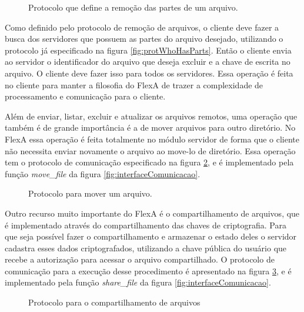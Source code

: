         \begin{figure}[!ht]
        \caption{Protocolo que define a remoção das partes de um arquivo.}
        \label{fig:protRemoveFile}
        \end{figure}
        
        
        Como definido pelo protocolo de remoção de arquivos, o cliente deve fazer a busca dos servidores que possuem as partes do arquivo desejado, utilizando o protocolo já especificado na figura \ref{fig:protWhoHasParts}. Então o cliente envia ao servidor o identificador do arquivo que deseja excluir e a chave de escrita no arquivo. O cliente deve fazer isso para todos os servidores. Essa operação é feita no cliente para manter a filosofia do FlexA de trazer a complexidade de processamento e comunicação para o cliente.
        
        Além de enviar, listar, excluir e atualizar os arquivos remotos, uma operação que também é de grande importância é a de mover arquivos para outro diretório. No FlexA essa operação é feita totalmente no módulo servidor de forma que o cliente não necessita enviar novamente o arquivo ao move-lo de diretório. Essa operação tem o protocolo de comunicação especificado na figura \ref{fig:protMoveFile}, e é implementado pela função \textit{move\_file} da figura \ref{fig:interfaceComunicacao}.
        
        \begin{figure}[!ht]
        \caption{Protocolo para mover um arquivo.}
        \label{fig:protMoveFile}
        \end{figure}
        
        
        Outro recurso muito importante do FlexA é o compartilhamento de arquivos, que é implementado através do compartilhamento das chaves de criptografia. Para que seja possível fazer o compartilhamento e armazenar o estado deles o servidor cadastra esses dados criptografados, utilizando a chave pública do usuário que recebe a autorização para acessar o arquivo compartilhado. O protocolo de comunicação para a execução desse procedimento é apresentado na figura \ref{fig:protShareFile}, e é implementado pela função \textit{share\_file} da figura \ref{fig:interfaceComunicacao}.
        
        \begin{figure}[!ht]
        \caption{Protocolo para o compartilhamento de arquivos}
        \label{fig:protShareFile}
        \end{figure}
        
